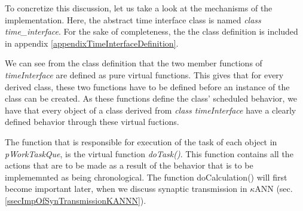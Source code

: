 	To concretize this discussion, let us take a look at the mechanisms of the implementation.
	Here, the abstract time interface class is named \emph{class time\_interface}.
	For the sake of completeness, the the class definition is included in appendix \ref{appendixTimeInterfaceDefinition}. %

	We can see from the class definition that the two member functions of \emph{timeInterface} are defined as pure virtual functions.
	This gives that for every derived class, these two functions have to be defined before an instance of the class can be created.
	As these functions define the class' scheduled behavior, we have that every object of a class derived from \emph{class timeInterface} have a clearly defined behavior through these virtual fuctions.

	The function that is responsible for execution of the task of each object in \emph{pWorkTaskQue}, is the virtual function \emph{doTask()}. %
	This function contains all the actions that are to be made as a result of the behavior that is to be implememnted as being chronological. %
	The function doCalculation() will first become important later, when we discuss synaptic transmission in $\kappa$ANN (sec. \ref{ssecImpOfSynTransmissionKANNN}). 
	 


